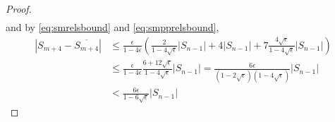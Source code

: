\documentclass[12pt]{article}
\providecommand{\fl}{\ensuremath{\text{fl}}}
\theoremstyle{definition}
\numberwithin{equation}{section}
\numberwithin{figure}{section}
\begin{document}
\begin{proof}
\begin{align*}
    \end{align*}
    and by \eqref{eq:smrelsbound} and \eqref{eq:smpprelsbound},
    \begin{align}
    |S_{m+4} - \overline{S_{m+4}}| 
        & \leq \frac{\epsilon}{1-4\epsilon} 
            \left(
                \frac{2}{1-4\sqrt{\epsilon}} |S_{n-1}|
                + 4 |S_{n-1}|
                + 7 \frac{4\sqrt{\epsilon}}{1-4\sqrt{\epsilon}} |S_{n-1}|
            \right) \nonumber \\
        & \leq \frac{\epsilon}{1-4\epsilon} \frac{6+12\sqrt{\epsilon}}{1-4\sqrt{\epsilon}} |S_{n-1}| 
            = \frac{6\epsilon }{(1-2\sqrt{\epsilon})(1-4\sqrt{\epsilon})} |S_{n-1}| \nonumber \\
        & < \frac{6\epsilon}{1-6\sqrt{\epsilon}} |S_{n-1}| 
        \label{eq:smfiveerror}
    \end{align}

\end{proof}
\end{document}
